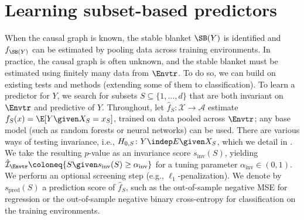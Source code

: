 



\section{
Learning subset-based predictors
} \label{sec:learning_subset_predictors}
When the causal graph is known, the stable blanket $\SB(Y)$ is identified and $f_{\SB(Y)}$ can be estimated by pooling data across training environments. 
%
%
In practice, the causal graph is often unknown, and the stable blanket must be estimated using finitely many data from $\Envtr$. To do so, we can build on existing tests and methods (extending some of them to classification). To learn a predictor for $Y$, we search for subsets $S \subseteq \{1, \ldots, d\}$ that are both invariant on $\Envtr$ and predictive of $Y$. Throughout, let $\hat{f}_S: \mathcal{X} \to \mathcal{A}$ estimate $f_S(x) = \E[Y \given X_S = x_S]$, trained on data pooled across $\Envtr$; any base model (such as random forests or neural networks) can be used.
There are various ways of testing invariance, i.e.,
$H_{0,S}\colon Y \indep E \given X_S$, %
which we detail
in . We take the resulting
$p$-value as an invariance score $s_\mathrm{inv}(S)$, yielding
$\hat{\mathcal{I}}_{\Envtr} \coloneq \{S \given s_\mathrm{inv}(S) \geq
\alpha_\mathrm{inv} \}$ for a tuning parameter
$\alpha_\mathrm{inv} \in (0,1)$. 
We perform an optional screening
step (e.g., $\ell_1$-penalization). We denote by $s_\mathrm{pred}(S)$ a prediction score of $\hat{f}_S$, such as the out-of-sample negative MSE for regression or the out-of-sample negative binary cross-entropy for classification on the training environments.

